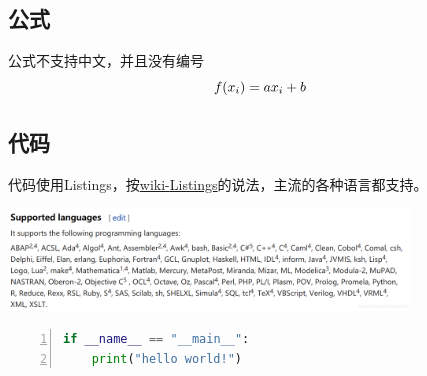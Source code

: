 \documentclass[UTF8]{ctexart}
\newenvironment{marktext}{}{}
\begin{document}
\begin{marktext}
\subsection{公式}


公式不支持中文，并且没有编号
\end{marktext}
\[
\\ f(x_i)=ax_i+b\\ \\
\]
\begin{marktext}


\subsection{代码}


代码使用Listings，按\href{https://en.wikibooks.org/wiki/LaTeX/Source_Code_Listings}{wiki{-}Listings}的说法，主流的各种语言都支持。
\begin{center}
\begin{marktext}
\vspace{\baselineskip}\includegraphics[width=0.8\textwidth]{images/53bb9cd2ced62c6673f39073ca9397b7.jpg}\vspace{\baselineskip}
\end{marktext}
\end{center}
\end{marktext}
\begin{lstlisting}[language={Python},keywordstyle=\color{blue!70},frame=shadowbox,showstringspaces=false,commentstyle=\color{red!50!green!50!blue!50},escapeinside=``,numbers=left,numberstyle=\small,basicstyle=\small]
if __name__ == "__main__":
	print("hello world!")
\end{lstlisting}
\end{document}
